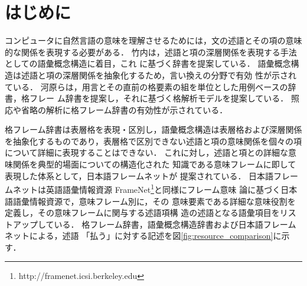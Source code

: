 \documentclass[japanese]{jnlp_1.2b}
\begin{document}
\maketitle



\newcommand{\underlines}[1]{}
\newcommand{\role}[4]{}
\newcommand{\target}[3]{}
\newcommand{\norole}[2]{}
\newcommand{\roleb}[3]{}
\newcommand{\rolebX}[4]{}
\newcommand{\targetb}[3]{}
\newcommand{\noroleb}[2]{}
\newcommand{\argmax}[1]{}




\section{はじめに}

コンピュータに自然言語の意味を理解させるためには，文の述語とその項の意味
的な関係を表現する必要がある．
竹内は，述語と項の深層関係を表現する手法としての語彙概念構造に着目，これ
に基づく辞書を提案している\cite{takeuchi04,takeuchi05}．
語彙概念構造は述語と項の深層関係を抽象化するため，言い換えの分野で有効
性が示されている\cite{furuhata04}．
河原らは，用言とその直前の格要素の組を単位とした用例ベースの辞書，格フレー
ム辞書を提案し，それに基づく格解析モデルを提案している\cite[など]
{kawahara05_1,kawahara05}．
照応や省略の解析に格フレーム辞書の有効性が示されている\cite[など]
{sasano04,kawahara04,kawahara03}．

格フレーム辞書は表層格を表現・区別し，語彙概念構造は表層格および深層関係
を抽象化するものであり，表層格で区別できない述語と項の意味関係を個々の項
について詳細に表現することはできない．
これに対し，述語と項との詳細な意味関係を典型的場面についての構造化された
知識である意味フレームに即して表現した体系として，日本語フレームネットが
提案されている\cite[など]{ohara05}．
日本語フレームネットは英語語彙情報資源
FrameNet\footnote{http://framenet.icsi.berkeley.edu}と同様にフレーム意味
論\cite{fillmore82}に基づく日本語語彙情報資源で，意味フレーム別に，その
意味要素である詳細な意味役割を定義し，その意味フレームに関与する述語項構
造の述語となる語彙項目をリストアップしている．
格フレーム辞書，語彙概念構造辞書および日本語フレームネットによる，述語
「払う」に対する記述を図\ref{fig:resource_comparison}に示す．
\end{document}

